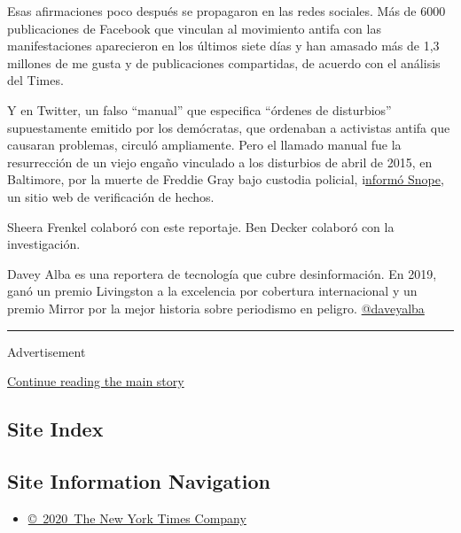 Esas afirmaciones poco después se propagaron en las redes sociales. Más
de 6000 publicaciones de Facebook que vinculan al movimiento antifa con
las manifestaciones aparecieron en los últimos siete días y han amasado
más de 1,3 millones de me gusta y de publicaciones compartidas, de
acuerdo con el análisis del Times.

Y en Twitter, un falso ``manual'' que especifica ``órdenes de
disturbios'' supuestamente emitido por los demócratas, que ordenaban a
activistas antifa que causaran problemas, circuló ampliamente. Pero el
llamado manual fue la resurrección de un viejo engaño vinculado a los
disturbios de abril de 2015, en Baltimore, por la muerte de Freddie Gray
bajo custodia policial,
i\href{https://www.snopes.com/fact-check/floyd-instruction-manual-protesters/}{nformó
Snope}, un sitio web de verificación de hechos.

Sheera Frenkel colaboró con este reportaje. Ben Decker colaboró con la
investigación.

Davey Alba es una reportera de tecnología que cubre desinformación. En
2019, ganó un premio Livingston a la excelencia por cobertura
internacional y un premio Mirror por la mejor historia sobre periodismo
en peligro. \href{https://twitter.com/daveyalba}{@daveyalba}

\begin{center}\rule{0.5\linewidth}{\linethickness}\end{center}

Advertisement

\protect\hyperlink{after-bottom}{Continue reading the main story}

\hypertarget{site-index}{%
\subsection{Site Index}\label{site-index}}

\hypertarget{site-information-navigation}{%
\subsection{Site Information
Navigation}\label{site-information-navigation}}

\begin{itemize}
\tightlist
\item
  \href{https://help.nytimes3xbfgragh.onion/hc/en-us/articles/115014792127-Copyright-notice}{©~2020~The
  New York Times Company}
\end{itemize}

